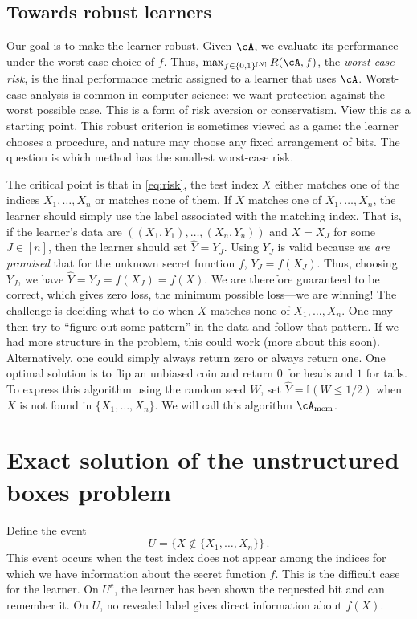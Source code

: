 \documentclass[11pt,twoside]{article}
\newcommand{\cAmem}{\cA_{\mathrm{mem}}}
\theoremstyle{definition}
\theoremstyle{remark}
\begin{document}
\subsection{Towards robust learners}
Our goal is to make the learner robust. Given $\cA$, we evaluate its performance
under the worst-case choice of $f$. Thus,
$\max_{f\in \{0,1\}^{[N]}} R(\cA,f)$, the \emph{worst-case risk}, is the final performance metric assigned
to a learner that uses $\cA$.
Worst-case analysis is common in computer science: we want protection against
the worst possible case. This is a form of risk aversion or conservatism.
View this as a starting point.
This robust criterion is sometimes viewed as a game: the learner chooses a
procedure, and nature may choose any fixed arrangement of bits. The question is
which method has the smallest worst-case risk.

The critical point is that in \cref{eq:risk}, the test index $X$ either matches
one of the indices $X_1,\dots,X_n$ or matches none of them.
If $X$ matches one of $X_1,\dots,X_n$, the learner should simply use the label
associated with the matching index.
That is, if the learner's data are $((X_1,Y_1), \dots, (X_n,Y_n))$ and $X = X_J$
for some $J\in [n]$, then the learner should set $\hat Y = Y_J$.
Using $Y_J$ is valid because \emph{we are promised} that for the unknown secret function
$f$, $Y_J = f(X_J)$. Thus, choosing $Y_J$, we have $\hat Y = Y_J = f(X_J) = f(X)$.
We are therefore guaranteed to be correct, which gives zero loss, the minimum
possible loss---we are winning!
The challenge is deciding what to do when $X$ matches none of
$X_1,\dots,X_n$.
One may then try to ``figure out some pattern''
in the data and follow that pattern. If we had more structure in the problem,
this could work (more about this soon).
Alternatively, one could simply always return zero or always return one.
One optimal solution is to flip an unbiased coin and return $0$ for heads and
$1$ for tails.
To express this algorithm using the random seed $W$, set
$\hat Y = \mathbb{I}(W\le 1/2)$ when
$X$ is not found in $\{X_1,\dots,X_n\}$.
We will call this algorithm $\cAmem$.

\section{Exact solution of the unstructured boxes problem}
\label{sec:theorem-statement}

Define the event
\begin{equation}
U=\{X\notin\{X_1,\ldots,X_n\}\}\,.
\label{eq:unseen-event}
\end{equation}
This event occurs when the test index does not appear among the indices for
which we have information about the secret function $f$. This is the difficult
case for the learner.
On $U^c$, the learner has been shown the requested bit and can remember it.
On $U$, no revealed label gives direct information about $f(X)$.
\end{document}
